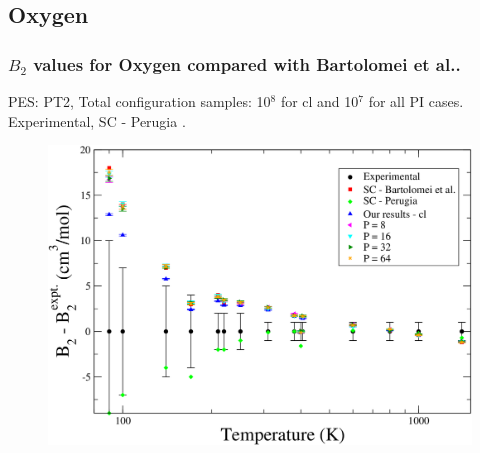 \documentclass[xcolor=svgnames]{beamer}
\begin{document}
        \subsection{Oxygen}
            \begin{frame}
                \frametitle{$B_2$ values for Oxygen compared with Bartolomei et al..}
                \begin{center}PES: PT2, Total configuration samples: 10$^8$ for cl and 10$^7$ for all PI cases. Experimental, SC - Perugia .\end{center}
                \begin{figure}[!htbp]
                    \centering
                    \includegraphics[scale=0.12,keepaspectratio]{B2O2AllExpDiffPT2.png}
                \end{figure}
            \end{frame}
\end{document}

